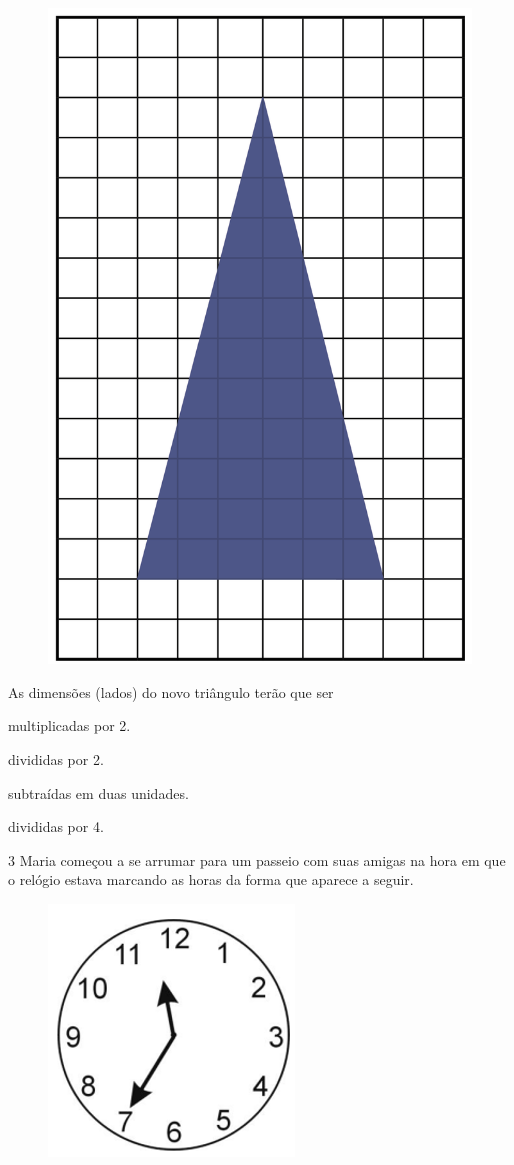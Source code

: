 \begin{figure}[htpb!]
\centering
\includegraphics[width=.6\textwidth]{../ilustracoes/MAT5/SAEB_5ANO_MAT_figura47.png}
\end{figure}

As dimensões (lados) do novo triângulo terão que ser

\begin{minipage}{.5\textwidth}
\begin{escolha}
\item
  multiplicadas por 2.
\item
  divididas por 2.
\item
  subtraídas em duas unidades.
\item
  divididas por 4.
\end{escolha}
\end{minipage}

\pagebreak
\num{3} Maria começou a se arrumar para um passeio com suas amigas na hora
em que o relógio estava marcando as horas da forma que aparece a seguir.

\begin{figure}[htpb!]
\centering
\includegraphics[width=.5\textwidth]{./imgs/mat9.png}
\end{figure}

